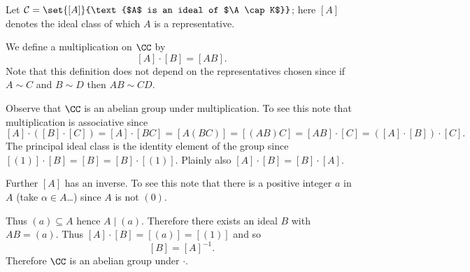 Let $\mathcal{C}=\set{[A]}{\text{$A$ is an ideal of $\A\cap K$}}$; here $[A]$ denotes the ideal class of which $A$ is a representative.

We define a multiplication on $\CC$ by
\[ [A]\cdot[B] = [AB] . \]
Note that this definition does not depend on the representatives chosen since if $A\sim C$ and $B\sim D$ then $AB\sim CD$.

Observe that $\CC$ is an abelian group under multiplication.  To see this note that multiplication is associative since
\[ [A]\cdot([B]\cdot[C])=[A]\cdot[BC]=[A(BC)]=[(AB)C]=[AB]\cdot[C]=([A]\cdot[B])\cdot[C] . \]
The principal ideal class is the identity element of the group since $[(1)]\cdot[B]=[B]=[B]\cdot[(1)]$.  Plainly also $[A]\cdot[B]=[B]\cdot[A]$.

Further $[A]$ has an inverse.  To see this note that there is a positive integer $a$ in $A$ (take $\alpha\in A$\dots) since $A$ is not $(0)$.

Thus $(a)\subseteq A$ hence $A\mid(a)$.  Therefore there exists an ideal $B$ with $AB=(a)$.  Thus $[A]\cdot[B]=[(a)]=[(1)]$ and so
\[ [B] = [A]^{-1} . \]
Therefore $\CC$ is an abelian group under $\cdot$.